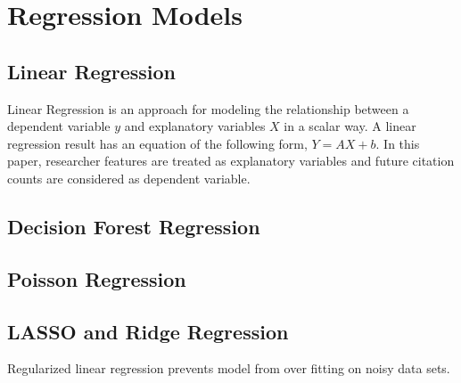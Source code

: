 \section{Regression Models}

\subsection{Linear Regression}
Linear Regression is an approach for modeling the relationship between a dependent variable $y$ and explanatory variables $X$ in a scalar way. A linear regression result has an equation of the following form, $Y = AX +b$. In this paper, researcher features are treated as explanatory variables and future citation counts are considered as dependent variable.
\subsection{Decision Forest Regression}
\subsection{Poisson Regression}
\subsection{LASSO and Ridge Regression}
Regularized linear regression prevents model from over fitting on noisy data sets\cite{}.
